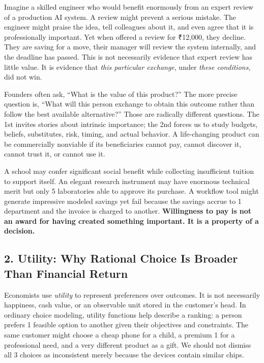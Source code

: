 Imagine a skilled engineer who would benefit enormously from an expert review of a production AI system. A review might prevent a serious mistake. The engineer might praise the idea, tell colleagues about it, and even agree that it is professionally important. Yet when offered a review for ₹12,000, they decline. They are saving for a move, their manager will review the system internally, and the deadline has passed. This is not necessarily evidence that expert review has little value. It is evidence that \emph{this particular exchange}, under \emph{these conditions}, did not win.

Founders often ask, ``What is the value of this product?'' The more precise question is, ``What will this person exchange to obtain this outcome rather than follow the best available alternative?'' Those are radically different questions. The 1st invites stories about intrinsic importance; the 2nd forces us to study budgets, beliefs, substitutes, risk, timing, and actual behavior. A life-changing product can be commercially nonviable if its beneficiaries cannot pay, cannot discover it, cannot trust it, or cannot use it.

A school may confer significant social benefit while collecting insufficient tuition to support itself. An elegant research instrument may have enormous technical merit but only 5 laboratories able to approve its purchase. A workflow tool might generate impressive modeled savings yet fail because the savings accrue to 1 department and the invoice is charged to another. \textbf{Willingness to pay is not an award for having created something important. It is a property of a decision.}

\subsection*{2. Utility: Why Rational Choice Is Broader Than Financial Return}

Economists use \emph{utility} to represent preferences over outcomes. It is not necessarily happiness, cash value, or an observable unit stored in the customer's head. In ordinary choice modeling, utility functions help describe a ranking: a person prefers 1 feasible option to another given their objectives and constraints. The same customer might choose a cheap phone for a child, a premium 1 for a professional need, and a very different product as a gift. We should not dismiss all 3 choices as inconsistent merely because the devices contain similar chips.

